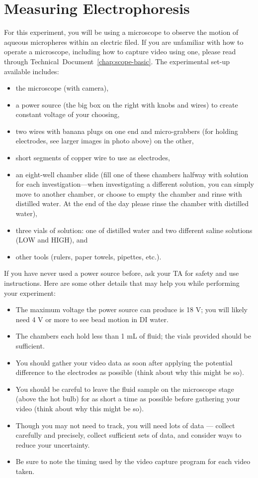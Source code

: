 \section{Measuring Electrophoresis}
For this experiment, you will be using a microscope to observe the motion of aqueous micropheres within an electric filed. If you are unfamiliar with how to operate a microscope, including how to capture video using one, please read through Technical~Document~\ref{chap:scope-basic}. The experimental set-up available includes:
\begin{itemize}
\itemsep-0.3em
\item the microscope (with camera),
\item a power source (the big box on the right with knobs and wires) to create constant voltage of your choosing,
\item two wires with banana plugs on one end and micro-grabbers (for holding electrodes, see larger images in photo above) on the other,
\item short segments of copper wire to use as electrodes,
\item an eight-well chamber slide (fill one of these chambers halfway with solution for each investigation—when investigating a different solution, you can simply move to another chamber, or choose to empty the chamber and rinse with distilled water. At the end of the day please rinse the chamber with distilled water),
\item three vials of solution: one of distilled water and two different saline solutions (LOW and HIGH), and
\item other tools (rulers, paper towels, pipettes, etc.).
\end{itemize}
If you have never used a power source before, ask your TA for safety and use instructions. Here are some other details that may help you while performing your experiment:
\begin{itemize}
\itemsep-0.3em
\item The maximum voltage the power source can produce is 18 V; you will likely need 4 V or more to see bead motion in DI water.
\item The chambers each hold less than 1 mL of fluid; the vials provided should be sufficient.
\item You should gather your video data as soon after applying the potential difference to the
electrodes as possible (think about why this might be so).
\item You should be careful to leave the fluid sample on the microscope stage (above the hot
bulb) for as short a time as possible before gathering your video (think about why this might
be so).
\item Though you may not need to track, you will need lots of data — collect carefully and
precisely, collect sufficient sets of data, and consider ways to reduce your uncertainty.
\item Be sure to note the timing used by the video capture program for each video taken.
\end{itemize}
